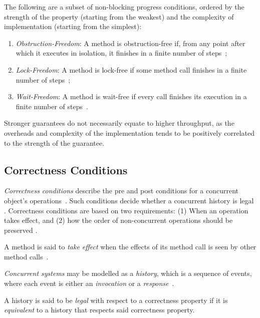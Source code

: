 The following are a subset of non-blocking progress conditions, ordered by the
strength of the property (starting from the weakest) and the complexity of
implementation (starting from the simplest):

\begin{enumerate}
\item \emph{Obstruction-Freedom}: A method is obstruction-free if, from any
point after which it executes in isolation, it finishes in a finite number of
steps~\citep[Section~3.8.3]{herlihy2020art};
\item \emph{Lock-Freedom}: A method is lock-free if some method call finishes
in a finite number of steps~\citep[Section~3.8.2]{herlihy2020art};
\item \emph{Wait-Freedom}: A method is wait-free if every call finishes its
execution in a finite number of steps~\citep[Section~3.8.1]{herlihy2020art}.
\end{enumerate}

Stronger guarantees do not necessarily equate to higher throughput, as the
overheads and complexity of the implementation tends to be positively
correlated to the strength of the guarantee.

\subsection{Correctness Conditions}
\label{sec:correctness_conditions}
\emph{Correctness conditions} describe the pre and post conditions for a concurrent
object's operations~\citep{herlihy2020art}. Such conditions decide
whether a concurrent history is legal \citep{herlihy1990linearizability}.
Correctness conditions are based on two requirements: (1) When an
operation takes effect, and (2) how the order of non-concurrent operations
should be preserved \citep{herlihy1990linearizability}.

A method is said to \emph{take effect} when the effects of its method call is
seen by other method calls~\citep[Section~3.4.1]{herlihy2020art}. 

\emph{Concurrent systems} may be modelled as a \emph{history}, which is a
sequence of events, where each event is either an \emph{invocation} or a
\emph{response}~\citep[Section~3.6.1]{herlihy2020art}. 

A history is said to be \emph{legal} with respect to a correctness property if
it is \emph{equivalent} to a history that respects said correctness property.

